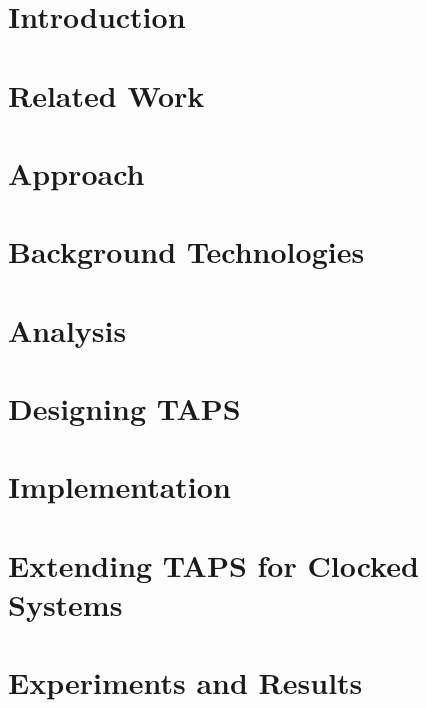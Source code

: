 \documentclass[a4paper]{report}
\begin{document}
\newpage
\tableofcontents

\newpage
{}


\chapter{Introduction}


\chapter{Related Work}
\label{chap:related_work}


\chapter{Approach}


\chapter{Background Technologies}
\label{chap:background}


\chapter{Analysis}
\label{chap:analysis}


\chapter{Designing TAPS}
\label{chap:design}


\chapter{Implementation}
\label{chap:implementation}


\chapter{Extending TAPS for Clocked Systems}
\label{chap:clock}


\chapter{Experiments and Results}
\label{chap:exp}

\end{document}
